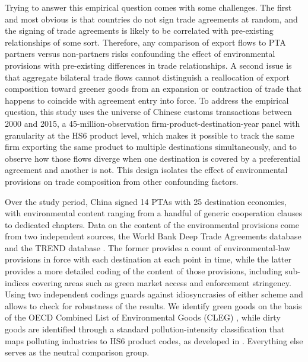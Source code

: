 \documentclass[12pt]{article}
\begin{document}
Trying to answer this empirical question comes with some challenges. The first and most obvious is that countries do not sign trade agreements at random, and the signing of trade agreements is likely to be correlated with pre-existing relationships of some sort. Therefore, any comparison of export flows to PTA partners versus non-partners risks confounding the effect of environmental provisions with pre-existing differences in trade relationships. A second issue is that aggregate bilateral trade flows cannot distinguish a reallocation of export composition toward greener goods from an expansion or contraction of trade that happens to coincide with agreement entry into force. To address the empirical question, this study uses the universe of Chinese customs transactions between 2000 and 2015, a 45-million-observation firm-product-destination-year panel with granularity at the HS6 product level, which makes it possible to track the same firm exporting the same product to multiple destinations simultaneously, and to observe how those flows diverge when one destination is covered by a preferential agreement and another is not. This design isolates the effect of environmental provisions on trade composition from other confounding factors.

Over the study period, China signed 14 PTAs with 25 destination economies, with environmental content ranging from a handful of generic cooperation clauses to dedicated chapters. Data on the content of the environmental provisions come from two independent sources, the World Bank Deep Trade Agreements database \citep{hofmann2017} and the TREND database \citep{morin2017}. The former provides a count of environmental-law provisions in force with each destination at each point in time, while the latter provides a more detailed coding of the content of those provisions, including sub-indices covering areas such as green market access and enforcement stringency. Using two independent codings guards against idiosyncrasies of either scheme and allows to check for robustness of the results. We identify green goods on the basis of the OECD Combined List of Environmental Goods (CLEG) \citep{sauvage2014}, while dirty goods are identified through a standard pollution-intensity classification that maps polluting industries to HS6 product codes, as developed in \cite{mani1998}. Everything else serves as the neutral comparison group.
\end{document}
